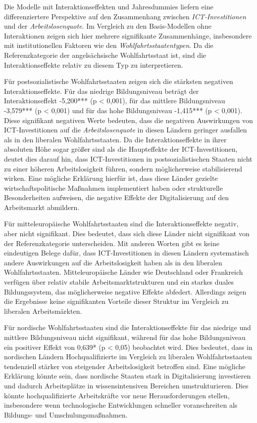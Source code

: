 

Die Modelle mit Interaktionseffekten und Jahresdummies liefern eine differenziertere 
Perspektive auf den Zusammenhang zwischen \textit{\ac{ICT}-Investitionen} und der 
\textit{Arbeitslosenquote}. Im Vergleich zu den Basis-Modellen ohne Interaktionen 
zeigen sich hier mehrere signifikante Zusammenhänge, insbesondere mit institutionellen 
Faktoren wie den \textit{Wohlfahrtsstaatentypen}. Da die Referenzkategorie der 
angelsächsische Wohlfahrtsstaat ist, sind die Interaktionseffekte relativ zu diesem 
Typ zu interpretieren.

Für postsozialistische Wohlfahrtsstaaten zeigen sich die stärksten negativen 
Interaktionseffekte. Für das niedrige Bildungsniveau beträgt der Interaktionseffekt 
-5,200*** (p < 0,001), für das mittlere Bildungsniveau -3,579*** (p < 0,001) und für 
das hohe Bildungsniveau -1,415*** (p < 0,001). Diese signifikant negativen Werte 
bedeuten, dass die negativen Auswirkungen von \ac{ICT}-Investitionen auf die 
\textit{Arbeitslosenquote} in diesen Ländern geringer ausfallen als in den liberalen 
Wohlfahrtsstaaten. Da die Interaktionseffekte in ihrer absoluten Höhe sogar größer 
sind als die Haupteffekte der \ac{ICT}-Investitionen, deutet dies darauf hin, dass 
\ac{ICT}-Investitionen in postsozialistischen Staaten nicht zu einer höheren 
Arbeitslosigkeit führen, sondern möglicherweise stabilisierend wirken. Eine 
mögliche Erklärung hierfür ist, dass diese Länder gezielte wirtschaftspolitische 
Maßnahmen implementiert haben oder strukturelle Besonderheiten aufweisen, die 
negative Effekte der Digitalisierung auf den Arbeitsmarkt abmildern.

Für mitteleuropäische Wohlfahrtsstaaten sind die Interaktionseffekte negativ, aber 
nicht signifikant. Dies bedeutet, dass sich diese Länder nicht signifikant von der 
Referenzkategorie unterscheiden. Mit anderen Worten gibt es keine eindeutigen Belege 
dafür, dass \ac{ICT}-Investitionen in diesen Ländern systematisch andere Auswirkungen 
auf die Arbeitslosigkeit haben als in den liberalen Wohlfahrtsstaaten. 
Mitteleuropäische Länder wie Deutschland oder Frankreich verfügen über relativ stabile 
Arbeitsmarktstrukturen und ein starkes duales Bildungssystem, das möglicherweise 
negative Effekte abfedert. Allerdings zeigen die Ergebnisse keine signifikanten 
Vorteile dieser Struktur im Vergleich zu liberalen Arbeitsmärkten.

Für nordische Wohlfahrtsstaaten sind die Interaktionseffekte für das niedrige und 
mittlere Bildungsniveau nicht signifikant, während für das hohe Bildungsniveau ein 
positiver Effekt von 0,639* (p < 0,05) beobachtet wird. Dies bedeutet, dass in 
nordischen Ländern Hochqualifizierte im Vergleich zu liberalen Wohlfahrtsstaaten 
tendenziell stärker von steigender Arbeitslosigkeit betroffen sind. Eine mögliche 
Erklärung könnte sein, dass nordische Staaten stark in Digitalisierung investieren 
und dadurch Arbeitsplätze in wissensintensiven Bereichen umstrukturieren. Dies 
könnte hochqualifizierte Arbeitskräfte vor neue Herausforderungen stellen, 
insbesondere wenn technologische Entwicklungen schneller voranschreiten als 
Bildungs- und Umschulungsmaßnahmen.

